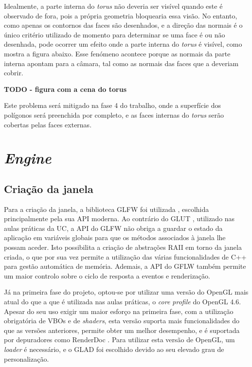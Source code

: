 \documentclass[12pt, a4paper]{article}
\begin{document}
Idealmente, a parte interna do \emph{torus} não deveria ser visível quando este é observado de fora,
pois a própria geometria bloquearia essa visão. No entanto, como apenas os contornos das faces são
desenhados, e a direção das normais é o único critério utilizado de momento para determinar se uma
face é ou não desenhada, pode ocorrer um efeito onde a parte interna do \emph{torus} é visível, como
mostra a figura abaixo. Esse fenómeno acontece porque as normais da parte interna apontam para a
câmara, tal como as normais das faces que a deveriam cobrir.

\textbf{\color{red} TODO - figura com a cena do torus}

Este problema será mitigado na fase 4 do trabalho, onde a superfície dos polígonos será preenchida
por completo, e as faces internas do \emph{torus} serão cobertas pelas faces externas.

\section{\emph{Engine}}

\subsection{Criação da janela}

Para a criação da janela, a biblioteca GLFW foi utilizada \cite{glfw}, escolhida principalmente pela
sua API moderna. Ao contrário do GLUT \cite{glut}, utilizado nas aulas práticas da UC, a API do GLFW
não obriga a guardar o estado da aplicação em variáveis globais para que os métodos associados à
janela lhe possam aceder. Isto possibilita a criação de abstrações RAII em torno da janela criada, o
que por sua vez permite a utilização das várias funcionalidades de C++ para gestão automática de
memória. Ademais, a API do GFLW também permite um maior controlo sobre o ciclo de resposta a eventos
e renderização.

Já na primeira fase do projeto, optou-se por utilizar uma versão do OpenGL mais atual do que a que é
utilizada nas aulas práticas, o \emph{core profile} do OpenGL 4.6. Apesar do seu uso exigir um maior
esforço na primeira fase, com a utilização obrigatória de VBOs e de \emph{shaders}, esta versão
suporta mais funcionalidades do que as versões anteriores, permite obter um melhor desempenho, e é
suportada por depuradores como RenderDoc \cite{renderdoc}. Para utilizar esta versão de OpenGL, um
\emph{loader} é necessário, e o GLAD \cite{glad} foi escolhido devido ao seu elevado grau de
personalização.
\end{document}
